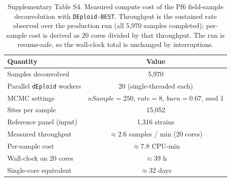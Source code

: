 \documentclass{article}
\begin{document}
\begin{table}[ht]
\centering
\begin{tabular}{lc}\hline\hline
Quantity & Value \\ \hline
Samples deconvolved & 5,970 \\
Parallel \texttt{dEploid} workers & 20 (single-threaded each) \\
MCMC settings & $nSample=250$, $rate=8$, $burn=0.67$, seed 1 \\
Sites per sample & 15,052 \\
Reference panel (input) & 1,316 strains \\
Measured throughput & $\approx$2.6 samples / min (20 cores) \\
Per-sample cost & $\approx$7.8 CPU-min \\
Wall-clock on 20 cores & $\approx$39 h \\
Single-core equivalent & $\approx$32 days \\
\hline
\end{tabular}
\caption{Supplementary Table S4. Measured compute cost of the Pf6 field-sample
deconvolution with \texttt{DEploid-BEST}. Throughput is the sustained rate
observed over the production run (all 5,970 samples completed); per-sample
cost is derived as 20 cores divided by that throughput. The run is resume-safe, so the wall-clock total is unchanged by
interruptions.}
\label{tab:field-time}
\end{table}

\newpage





\end{document}
